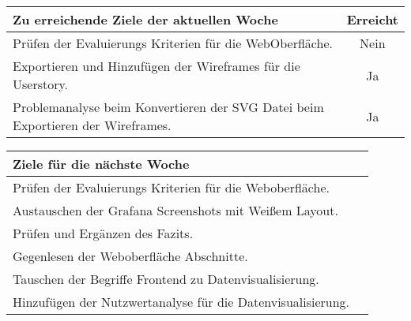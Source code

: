 \begin{tabularx}{\textwidth}{Xc}
    \arrayrulecolor{OliveGreen}
    \toprule
    {\bfseries Zu erreichende Ziele der aktuellen Woche} & {\bfseries Erreicht} \\
    \midrule[2pt]
    Prüfen der Evaluierungs Kriterien für die WebOberfläche. &Nein            \\
    \rowcolor{OliveGreen!15}
    Exportieren und Hinzufügen der Wireframes für die Userstory.      &Ja     \\
    \rowcolor{White}
    Problemanalyse beim Konvertieren der SVG Datei beim Exportieren der
    Wireframes.                                              &Ja              \\
    \bottomrule[2pt]
\end{tabularx}
%
\vspace{1cm}
%
\begin{tabularx}{\textwidth}{Xc}
    \arrayrulecolor{OliveGreen}
    \toprule
    {\bfseries Ziele für die nächste Woche}        &                         \\
    \midrule[2pt]
    Prüfen der Evaluierungs Kriterien für die Weboberfläche.    &             \\
    \rowcolor{OliveGreen!15}
    Austauschen der Grafana Screenshots mit Weißem Layout.  &                 \\
    \rowcolor{White}
    Prüfen und Ergänzen des Fazits.                         &                 \\
    \rowcolor{OliveGreen!15}
    Gegenlesen der Weboberfläche Abschnitte.               &                  \\
    \rowcolor{White}
    Tauschen der Begriffe Frontend zu Datenvisualisierung. &                  \\
    \rowcolor{OliveGreen!15}
    Hinzufügen der Nutzwertanalyse für die Datenvisualisierung. &             \\
\end{tabularx}
